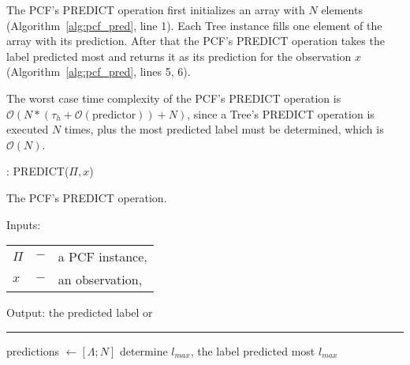 The PCF's PREDICT operation first initializes an array with
$N$ elements (Algorithm~\ref{alg:pcf_pred}, line 1). Each
Tree instance fills one element of the array with its
prediction. After that the PCF's PREDICT operation takes
the label predicted most and returns it as its prediction
for the observation $x$ (Algorithm~\ref{alg:pcf_pred},
lines 5, 6).

The worst case time complexity of the PCF's PREDICT
operation is $\mathcal{O}(N * (\tau_h + \mathcal{O}
(\text{predictor})) + N)$, since a Tree's PREDICT operation
is executed $N$ times, plus the most predicted label
must be determined, which is $\mathcal{O}(N)$.

\begin{algorithm}
  \caption{: PREDICT($\Pi, x$)}
  \label{alg:pcf_pred}
  The PCF's PREDICT operation.

  Inputs:

    \begin{tabu}{llX}
    $\Pi$ &$-$ &a PCF instance,\\
    $x$ &$-$ &an observation, \\
    \end{tabu}

  Output: the predicted label or \Lambda

  \noindent\rule{\linewidth}{0.4pt}

  \begin{algorithmic}[1]
    \STATE predictions $\leftarrow [\Lambda; N]$
    \ENDFOR
    \STATE determine $l_{max}$, the label predicted most
    \RETURN $l_{max}$
  \end{algorithmic}
\end{algorithm}
